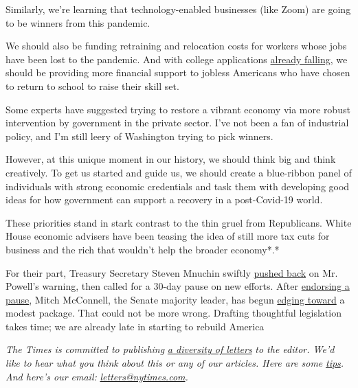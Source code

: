 Similarly, we're learning that technology-enabled businesses (like Zoom)
are going to be winners from this pandemic.

We should also be funding retraining and relocation costs for workers
whose jobs have been lost to the pandemic. And with college applications
\href{https://www.wsj.com/articles/fewer-students-apply-for-college-financial-aid-a-sign-coronavirus-may-disrupt-enrollment-11589284806}{already
falling}, we should be providing more financial support to jobless
Americans who have chosen to return to school to raise their skill set.

Some experts have suggested trying to restore a vibrant economy via more
robust intervention by government in the private sector. I've not been a
fan of industrial policy, and I'm still leery of Washington trying to
pick winners.

However, at this unique moment in our history, we should think big and
think creatively. To get us started and guide us, we should create a
blue-ribbon panel of individuals with strong economic credentials and
task them with developing good ideas for how government can support a
recovery in a post-Covid-19 world.

These priorities stand in stark contrast to the thin gruel from
Republicans. White House economic advisers have been teasing the idea of
still more tax cuts for business and the rich that wouldn't help the
broader economy*.*

For their part, Treasury Secretary Steven Mnuchin swiftly
\href{https://www.bloomberg.com/news/articles/2020-05-14/mnuchin-seeks-to-assuage-investors-after-powell-s-gloomy-outlook?sref=qN0DZypA}{pushed
back} on Mr. Powell's warning, then called for a 30-day pause on new
efforts. After
\href{https://www.politico.com/news/2020/05/20/mcconnell-unemployment-benefits-271661}{endorsing
a pause}, Mitch McConnell, the Senate majority leader, has begun
\href{https://www.politico.com/newsletters/morning-money/2020/05/27/mcconnell-says-another-relief-package-is-coming-787905}{edging
toward} a modest package. That could not be more wrong. Drafting
thoughtful legislation takes time; we are already late in starting to
rebuild America

\emph{The Times is committed to publishing}
\href{https://www.nytimes.com/2019/01/31/opinion/letters/letters-to-editor-new-york-times-women.html}{\emph{a
diversity of letters}} \emph{to the editor. We'd like to hear what you
think about this or any of our articles. Here are some}
\href{https://help.nytimes.com/hc/en-us/articles/115014925288-How-to-submit-a-letter-to-the-editor}{\emph{tips}}\emph{.
And here's our email:}
\href{mailto:letters@nytimes.com}{\emph{letters@nytimes.com}}\emph{.}

